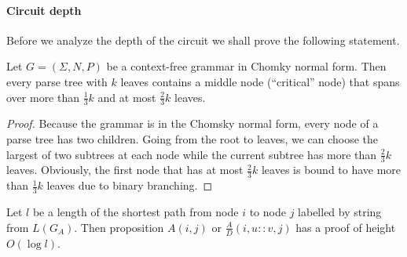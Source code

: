 \paragraph{Circuit depth}
Before we analyze the depth of the circuit we shall prove the following statement.
\begin{lemma}
\label{bigsubtree}
Let $G = (\Sigma, N, P)$ be a context-free grammar in Chomky normal form. Then every parse tree with $k$ leaves contains a middle node (``critical'' node) that spans over more than $\frac{1}{3}k$ and at most $\frac{2}{3}k$ leaves.
\end{lemma}
\begin{proof} Because the grammar is in the Chomsky normal form, every node of a parse tree has two children. Going from the root to leaves, we can choose the largest of two subtrees at each node while the current subtree has more than $\frac{2}{3}k$ leaves. Obviously, the first node that has at most $\frac{2}{3}k$ leaves is bound to have more than $\frac{1}{3}k$ leaves due to binary branching. 
\end{proof}
\begin{lemma}
\label{depthproof}
Let $l$ be a length of the shortest path from node $i$  to node $j$ labelled by string from $L(G_A)$. Then proposition $A(i, j)$ or $\frac{A}{D}(i , u :: v, j)$ has a proof of height $O(\log l)$.
\end{lemma}
